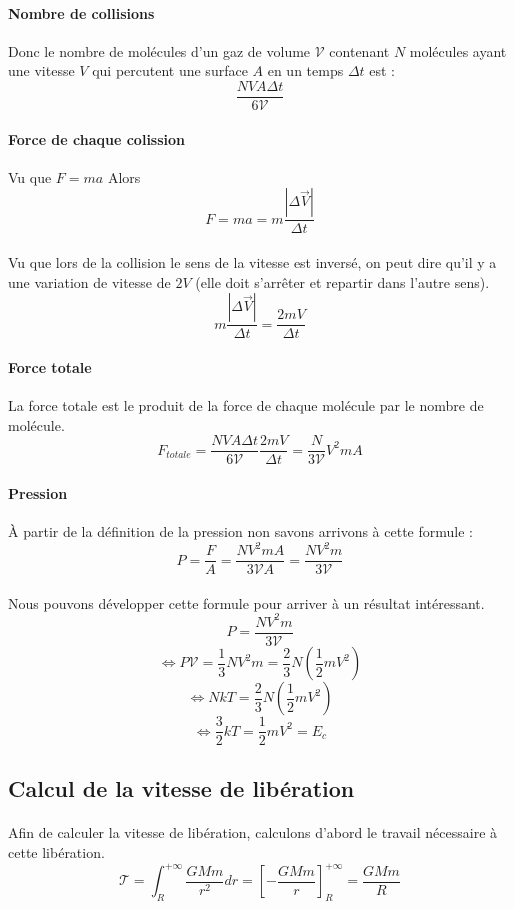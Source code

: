 \documentclass[a4paper]{article}
\begin{document}
\paragraph{Nombre de collisions}Donc le nombre de molécules d'un gaz de volume $\mathscr{V}$ contenant $N$ molécules ayant une vitesse $V$ qui percutent une surface $A$ en un temps $\Delta t$ est :
\[\frac{NVA\Delta t}{6\mathscr{V}}\] 
\paragraph{Force de chaque colission}
Vu que $F=ma$ Alors
\[F=ma=m\frac{\left|\Delta\vec{V}\right|}{\Delta t}\]
\paragraph{}Vu que lors de la collision le sens de la vitesse est inversé, on peut dire qu'il y a une variation de vitesse de $2V$ (elle doit s'arrêter et repartir dans l'autre sens).
\[m\frac{\left|\Delta\vec{V}\right|}{\Delta t}=\frac{2mV}{\Delta t}\]
\paragraph{Force totale}La force totale est le produit de la force de chaque molécule par le nombre de molécule.
\[F_{totale}=\frac{NVA\Delta t}{6\mathscr{V}}\frac{2mV}{\Delta t}=\frac{N}{3\mathscr{V}}V^2mA\]
\paragraph{Pression}À partir de la définition de la pression non savons arrivons à cette formule :
\[P=\frac{F}{A}=\frac{NV^2mA}{3\mathscr{V}A}=\frac{NV^2m}{3\mathscr{V}}\]
\paragraph{}Nous pouvons développer cette formule pour arriver à un résultat intéressant.
\[P=\frac{NV^2m}{3\mathscr{V}}\]
\[\Leftrightarrow P\mathscr{V}=\frac{1}{3}NV^2m=\frac{2}{3}N\left(\frac{1}{2}mV^2\right)\]
\[\Leftrightarrow NkT=\frac{2}{3}N\left(\frac{1}{2}mV^2\right)\]
\[\Leftrightarrow \frac{3}{2}kT=\frac{1}{2}mV^2=E_c\]
\subsection{Calcul de la vitesse de libération}
\paragraph{}Afin de calculer la vitesse de libération, calculons d'abord le travail nécessaire à cette libération.
\[\mathscr{T}=\int_R^{+\infty}\frac{GMm}{r^2}dr=\left[-\frac{GMm}{r}\right]_R^{+\infty}=\frac{GMm}{R}\]
\end{document}
